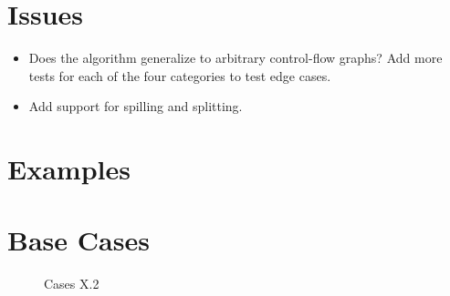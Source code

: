 \documentclass[12pt]{article}
\begin{document}
\pagebreak

\section{Issues}

\begin{itemize}
  \item
    Does the algorithm generalize to arbitrary control-flow graphs?
    Add more tests for each of the four categories to test edge cases.
  \item 
    Add support for spilling and splitting.
\end{itemize}

\section{Examples}

\section{Base Cases}

\begin{figure}[h!]
  \centering
   \hfill
  \caption{Cases X.2}
\end{figure}
\end{document}
